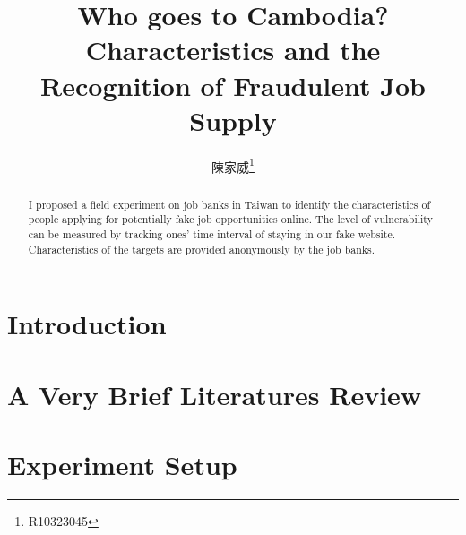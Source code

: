 \documentclass[11pt, a4paper]{article}
\title{Who goes to Cambodia? Characteristics and the Recognition of Fraudulent Job Supply}
\author{陳家威\thanks{R10323045}}
\begin{document}
    \maketitle
    \begin{abstract}
        I proposed a field experiment on job banks in Taiwan to identify the characteristics of people applying for potentially fake 
        job opportunities online. The level of vulnerability can be measured by tracking ones' time interval of staying in our fake website. 
        Characteristics of the targets are provided anonymously by the job banks.
    \end{abstract}

    \section{Introduction}
    

    \section{A Very Brief Literatures Review}
    

    \section{Experiment Setup}
    

    
    
\end{document}
